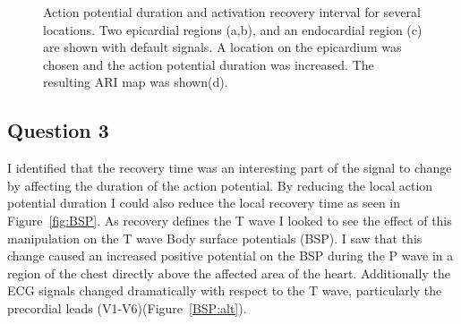 \documentclass[12pt]{article}
\newcommand{\fig}[1]{Figure~\ref{#1}}
\begin{document}
\begin{figure}[H]
\begin{subfigure}{0.45\textwidth}
		\caption{}
		\label{APD:epichanged}
	\end{subfigure}

	\caption{Action potential duration and activation recovery interval for several locations. Two epicardial regions (a,b), and an endocardial region (c) are shown with default signals. A location on the epicardium was chosen and the action potential duration was increased. The resulting ARI map was shown(d). }
	\label{fig:APD}
\end{figure}

\subsection{Question 3}
I identified that the recovery time was an interesting part of the signal to change by affecting the duration of the action potential. By reducing the local action potential duration I could also reduce the local recovery time as seen in \fig{fig:BSP}. As recovery defines the T wave I looked to see the effect of this manipulation on the T wave Body surface potentials  (BSP). I saw that this change caused an increased positive potential on the BSP during the P wave in a region of the chest directly above the affected area of the heart. Additionally the ECG signals changed dramatically with respect to the T wave, particularly the precordial leads (V1-V6)(\fig{BSP:alt}).
\end{document}
